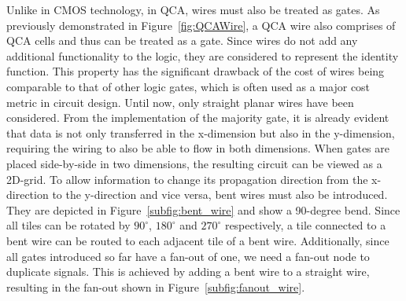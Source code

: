 Unlike in CMOS technology, in QCA, wires must also be treated as gates. As previously demonstrated in Figure~\ref{fig:QCAWire}, a QCA wire also comprises of QCA cells and thus can be treated as a gate. Since wires do not add any additional functionality to the logic, they are considered to represent the identity function. This property has the significant drawback of the cost of wires being comparable to that of other logic gates, which is often used as a major cost metric in circuit design. Until now, only straight planar wires have been considered. From the implementation of the majority gate, it is already evident that data is not only transferred in the x-dimension but also in the y-dimension, requiring the wiring to also be able to flow in both dimensions. When gates are placed side-by-side in two dimensions, the resulting circuit can be viewed as a 2D-grid. To allow information to change its propagation direction from the x-direction to the y-direction and vice versa, bent wires must also be introduced. They are depicted in Figure~\ref{subfig:bent_wire} and show a 90-degree bend. Since all tiles can be rotated by $90^{\circ}$, $180^{\circ}$ and $270^{\circ}$ respectively, a tile connected to a bent wire can be routed to each adjacent tile of a bent wire. Additionally, since all gates introduced so far have a fan-out of one, we need a fan-out node to duplicate signals. This is achieved by adding a bent wire to a straight wire, resulting in the fan-out shown in Figure~\ref{subfig:fanout_wire}.
